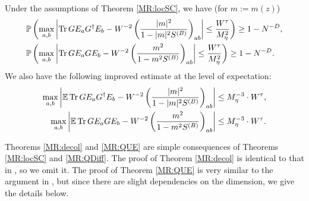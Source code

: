 \begin{theorem}\label{MR:QDiff}
Under the assumptions of Theorem \ref{MR:locSC}, we have (for $m:=m(z)$)
 \begin{align}\label{Meq:QdW1}
 &
 \mathbb P\left(\max_{a,b }   \left|\operatorname{Tr} G E_a G^\dagger E_b- W^{-2}\left(\frac{|m|^2}{1-|m|^2 S^{(B)}} \right)_{ab}\right|\le\frac{W^\tau}{ M_{\eta}^{ 2}}\right)\ge 1-N^{-D},
 \\ \label{Meq:QdW2}
 &
 \mathbb P\left( \max_{a,b }   \left|\operatorname{Tr} G E_a G  E_b- W^{-2}\left(\frac{m^2}{1-m^2 S^{(B)}} \right)_{ab}\right|\le\frac{W^\tau}{M_{\eta}^{ 2}}\right)\ge 1-N^{-D}.
\end{align}
We also have the following improved estimate at the level of expectation:
\begin{align}\label{Meq:QdS1}
 \max_{a,b }   \left|\mathbb E\operatorname{Tr} G E_a G^\dagger E_b- W^{-{2}}\left(\frac{|m|^2}{1-|m|^2 S^{(B)}} \right)_{ab}\right|\le  M_{\eta}^{-3} \cdot W^\tau,   \\
 \label{Meq:QdS2}
 \max_{a,b }   \left|\mathbb E\operatorname{Tr} G E_a G  E_b- W^{-{2}}\left(\frac{m^2}{1-m^2 S^{(B)}} \right)_{ab}\right|\le M_{\eta}^{-3} \cdot W^\tau   .
\end{align}
\end{theorem}


Theorems \ref{MR:decol} and \ref{MR:QUE} are simple consequences of Theorems \ref{MR:locSC} and \ref{MR:QDiff}. The proof of Theorem \ref{MR:decol} is identical to that in \cite{YY_25}, so we omit it. The proof of Theorem \ref{MR:QUE} is very similar to the argument in \cite{YY_25}, but since there are slight dependencies on the dimension, we give the details below.

